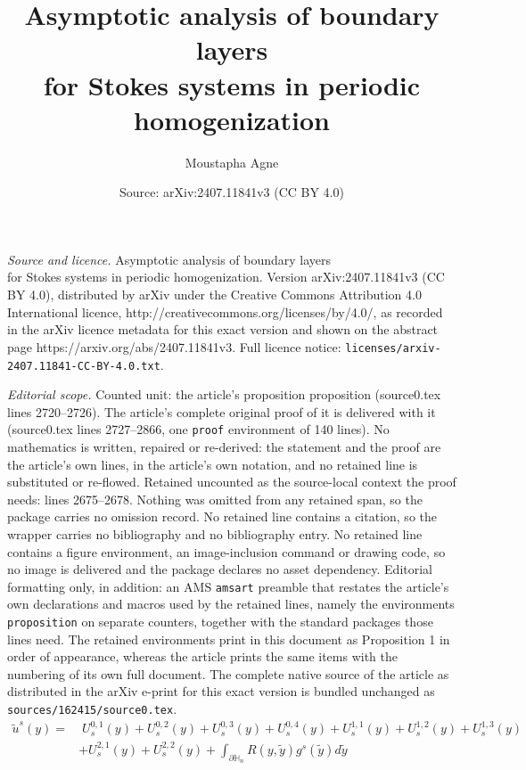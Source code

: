 \documentclass[10pt,a4paper]{amsart}
\title{Asymptotic analysis of boundary layers\\ for Stokes systems in periodic homogenization}
\author{Moustapha Agne}
\date{Source: arXiv:2407.11841v3 (CC BY 4.0)}
\begin{document}
\maketitle

\noindent\emph{Source and licence.} Asymptotic analysis of boundary layers\\ for Stokes systems in periodic homogenization. Version arXiv:2407.11841v3 (CC BY 4.0), distributed by arXiv under the Creative Commons Attribution 4.0 International licence, http://creativecommons.org/licenses/by/4.0/, as recorded in the arXiv licence metadata for this exact version and shown on the abstract page https://arxiv.org/abs/2407.11841v3. Full licence notice: \texttt{licenses/arxiv-2407.11841-CC-BY-4.0.txt}.\par\smallskip

\noindent\textit{Editorial scope.} Counted unit: the article's proposition proposition (source0.tex lines 2720--2726). The article's complete original proof of it is delivered with it (source0.tex lines 2727--2866, one \texttt{proof} environment of 140 lines). No mathematics is written, repaired or re-derived: the statement and the proof are the article's own lines, in the article's own notation, and no retained line is substituted or re-flowed.  Retained uncounted as the source-local context the proof needs: lines 2675--2678.  Nothing was omitted from any retained span, so the package carries no omission record.  No retained line contains a citation, so the wrapper carries no bibliography and no bibliography entry.  No retained line contains a figure environment, an image-inclusion command or drawing code, so no image is delivered and the package declares no asset dependency.  Editorial formatting only, in addition: an AMS \texttt{amsart} preamble that restates the article's own declarations and macros used by the retained lines, namely the environments \texttt{proposition} on separate counters, together with the standard packages those lines need.  The retained environments print in this document as Proposition 1 in order of appearance, whereas the article prints the same items with the numbering of its own full document.  The complete native source of the article as distributed in the arXiv e-print for this exact version is bundled unchanged as \texttt{sources/162415/source0.tex}.
\begin{align}
	\tilde{u}^s	(y)=& \; U_s^{0,1}(y) +U_s^{0,2}(y) +U_s^{0,3}(y) +U_s^{0,4}(y) +U_s^{1,1}(y) +U_s^{1,2}(y) +U_s^{1,3}(y) \nonumber\\
	& +U_s^{2,1}(y) +U_s^{2,2}(y)+\int_{\partial\mathbb{H}_n} R(y,\tilde{y}) g^s(\tilde{y}) d\tilde{y} \label{expans_tild_u_s}
\end{align}
\end{document}
